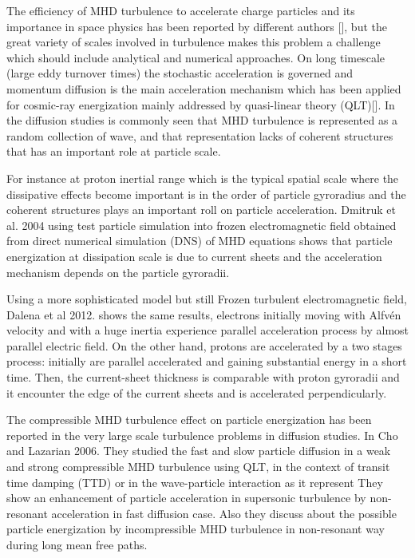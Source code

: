 \documentclass[11pt,twocolumn]{article}
\begin{document}
The efficiency of MHD turbulence to accelerate charge particles and its importance in space physics has been reported by different authors [], but the great variety of scales involved in turbulence makes this problem a challenge which should include analytical and numerical approaches. On long  timescale (large eddy turnover times) the stochastic acceleration is governed and momentum diffusion is the main acceleration mechanism which has been applied for cosmic-ray energization mainly addressed by quasi-linear theory (QLT)[]. In the diffusion studies is commonly seen that MHD turbulence is represented as a random collection of wave, and that representation lacks of coherent structures that has an important role at particle scale.

For instance at proton inertial range which is the typical spatial scale where the dissipative effects become important is in the order of particle gyroradius and the coherent structures plays an important roll on particle acceleration. Dmitruk et al. 2004  using test particle simulation into frozen electromagnetic field obtained from direct numerical simulation (DNS) of MHD equations shows that particle energization at dissipation scale is due to current sheets and the acceleration mechanism depends on the particle gyroradii. 

Using a more sophisticated model but still Frozen turbulent electromagnetic field, Dalena et al 2012. shows the same results, electrons initially moving with Alfv\'en velocity and with a huge inertia experience parallel acceleration process by almost parallel electric field. On the other hand, protons are accelerated by a two stages process: initially are parallel accelerated and gaining substantial energy in a short time. Then, the current-sheet thickness is comparable with proton gyroradii and it encounter the edge of the current sheets and is accelerated perpendicularly.  


The compressible MHD turbulence effect on particle energization has been reported in the very large scale turbulence problems in diffusion studies. In Cho and Lazarian 2006. They studied the fast and slow particle diffusion in a weak and strong compressible MHD turbulence  using QLT, in the context of transit time damping (TTD) or in the wave-particle interaction as it represent  They show an enhancement of particle acceleration in supersonic turbulence by non-resonant acceleration in fast diffusion case.  Also they discuss about the possible particle energization by incompressible MHD turbulence in non-resonant way during long mean free paths.
\end{document}
